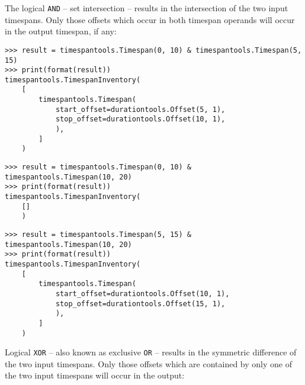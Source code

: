 \noindent The logical \texttt{AND} -- set intersection -- results in the
intersection of the two input timespans. Only those offsets which occur in both
timespan operands will occur in the output timespan, if any:

\begin{comment}
<abjad>
result = timespantools.Timespan(0, 10) & timespantools.Timespan(5, 15)
print(format(result))
result = timespantools.Timespan(0, 10) & timespantools.Timespan(10, 20)
print(format(result))
result = timespantools.Timespan(5, 15) & timespantools.Timespan(10, 20)
print(format(result))
</abjad>
\end{comment}

\begin{abjadbookoutput}
\begin{singlespacing}
\vspace{-0.5\baselineskip}
\begin{lstlisting}
>>> result = timespantools.Timespan(0, 10) & timespantools.Timespan(5, 15)
>>> print(format(result))
timespantools.TimespanInventory(
    [
        timespantools.Timespan(
            start_offset=durationtools.Offset(5, 1),
            stop_offset=durationtools.Offset(10, 1),
            ),
        ]
    )
\end{lstlisting}
\begin{lstlisting}
>>> result = timespantools.Timespan(0, 10) & timespantools.Timespan(10, 20)
>>> print(format(result))
timespantools.TimespanInventory(
    []
    )
\end{lstlisting}
\begin{lstlisting}
>>> result = timespantools.Timespan(5, 15) & timespantools.Timespan(10, 20)
>>> print(format(result))
timespantools.TimespanInventory(
    [
        timespantools.Timespan(
            start_offset=durationtools.Offset(10, 1),
            stop_offset=durationtools.Offset(15, 1),
            ),
        ]
    )
\end{lstlisting}
\end{singlespacing}
\end{abjadbookoutput}

\noindent Logical \texttt{XOR} -- also known as exclusive \texttt{OR} --
results in the symmetric difference of the two input timespans. Only those
offsets which are contained by only one of the two input timespans will occur
in the output:

\begin{comment}
<abjad>
result = timespantools.Timespan(0, 10) ^ timespantools.Timespan(5, 15)
print(format(result))
result = timespantools.Timespan(0, 10) ^ timespantools.Timespan(10, 20)
print(format(result))
result = timespantools.Timespan(5, 15) ^ timespantools.Timespan(10, 20)
print(format(result))
</abjad>
\end{comment}

